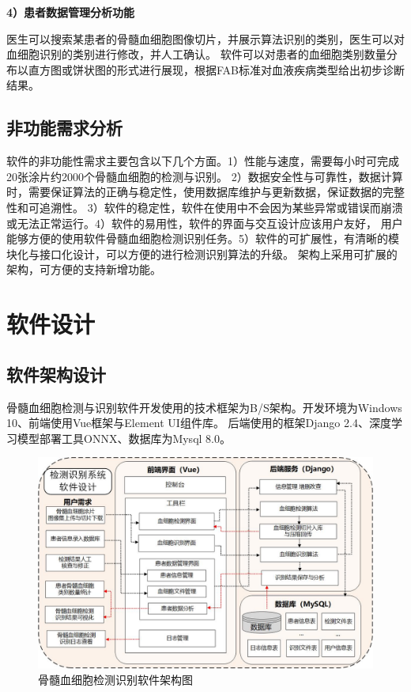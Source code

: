 \textbf{4）患者数据管理分析功能}

医生可以搜索某患者的骨髓血细胞图像切片，并展示算法识别的类别，医生可以对血细胞识别的类别进行修改，并人工确认。
软件可以对患者的血细胞类别数量分布以直方图或饼状图的形式进行展现，根据FAB标准对血液疾病类型给出初步诊断结果。

\subsection{非功能需求分析}
软件的非功能性需求主要包含以下几个方面。1）性能与速度，需要每小时可完成20张涂片约2000个骨髓血细胞的检测与识别。
2）数据安全性与可靠性，数据计算时，需要保证算法的正确与稳定性，使用数据库维护与更新数据，保证数据的完整性和可追溯性。
3）软件的稳定性，软件在使用中不会因为某些异常或错误而崩溃或无法正常运行。4）软件的易用性，软件的界面与交互设计应该用户友好，
用户能够方便的使用软件骨髓血细胞检测识别任务。5）软件的可扩展性，有清晰的模块化与接口化设计，可以方便的进行检测识别算法的升级。
架构上采用可扩展的架构，可方便的支持新增功能。

\section{软件设计}

\subsection{软件架构设计}
骨髓血细胞检测与识别软件开发使用的技术框架为B/S架构。开发环境为Windows 10、前端使用Vue框架与Element UI组件库。
后端使用的框架Django 2.4、深度学习模型部署工具ONNX、数据库为Mysql 8.0。

\begin{figure}[htbp]                     
  \centering                      
  \includegraphics[width=0.99\linewidth]{software_structure.jpg}                      
  \caption{骨髓血细胞检测识别软件架构图}                      
  \label{fig:software}       
\end{figure}

